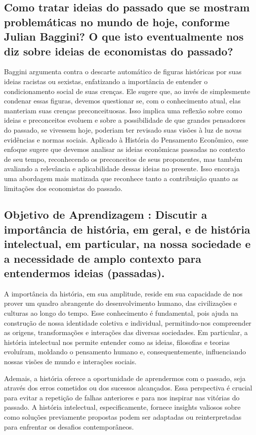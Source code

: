 \documentclass[a4paper,12pt]{article}[abntex2]
\begin{document}
\subsection{\textbf{Como tratar ideias do passado que se mostram problemáticas no mundo de hoje,
conforme Julian Baggini? O que isto eventualmente nos diz sobre ideias de economistas
do passado?}}
 Baggini argumenta contra o descarte automático de figuras históricas por suas ideias racistas ou sexistas, enfatizando a importância de entender o condicionamento social de suas crenças. Ele sugere que, ao invés de simplesmente condenar essas figuras, devemos questionar se, com o conhecimento atual, elas manteriam suas crenças preconceituosas. Isso implica uma reflexão sobre como ideias e preconceitos evoluem e sobre a possibilidade de que grandes pensadores do passado, se vivessem hoje, poderiam ter revisado suas visões à luz de novas evidências e normas sociais. Aplicado à História do Pensamento Econômico, esse enfoque sugere que devemos analisar as ideias econômicas passadas no contexto de seu tempo, reconhecendo os preconceitos de seus proponentes, mas também avaliando a relevância e aplicabilidade dessas ideias no presente. Isso encoraja uma abordagem mais matizada que reconhece tanto a contribuição quanto as limitações dos economistas do passado.

\subsection{\textbf{Objetivo de Aprendizagem : Discutir a importância de história, em geral, e de história intelectual, em particular, na nossa sociedade e a necessidade de amplo contexto para entendermos ideias (passadas).}}
A importância da história, em sua amplitude, reside em sua capacidade de nos prover um quadro abrangente do desenvolvimento humano, das civilizações e culturas ao longo do tempo. Esse conhecimento é fundamental, pois ajuda na construção de nossa identidade coletiva e individual, permitindo-nos compreender as origens, transformações e interações das diversas sociedades. Em particular, a história intelectual nos permite entender como as ideias, filosofias e teorias evoluíram, moldando o pensamento humano e, consequentemente, influenciando nossas visões de mundo e interações sociais.

Ademais, a história oferece a oportunidade de aprendermos com o passado, seja através dos erros cometidos ou dos sucessos alcançados. Essa perspectiva é crucial para evitar a repetição de falhas anteriores e para nos inspirar nas vitórias do passado. A história intelectual, especificamente, fornece insights valiosos sobre como soluções previamente propostas podem ser adaptadas ou reinterpretadas para enfrentar os desafios contemporâneos.
\end{document}
